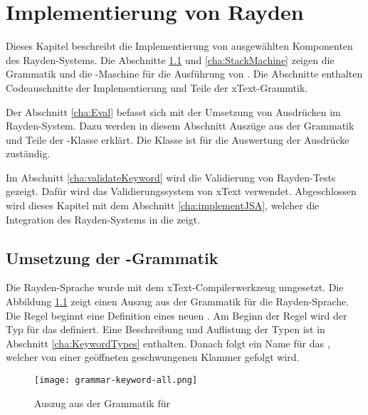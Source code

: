 \chapter{Implementierung von Rayden}
\label{cha:Implementierung}

Dieses Kapitel beschreibt die Implementierung von ausgewählten Komponenten des Rayden-Systems. Die Abschnitte \ref{cha:KeywordGrammar} und \ref{cha:StackMachine} zeigen die Grammatik und die -Maschine für die Ausführung von . Die Abschnitte enthalten Codeauschnitte der Implementierung und Teile der xText-Grammtik.

\SuperPar
Der Abschnitt \ref{cha:Eval} befasst sich mit der Umsetzung von Ausdrücken im Rayden-System. Dazu werden in diesem Abschnitt Auszüge aus der Grammatik und Teile der -Klasse erklärt. Die Klasse  ist für die Auswertung der Ausdrücke zuständig. 

\SuperPar
Im Abschnitt \ref{cha:validateKeyword} wird die Validierung von Rayden-Tests gezeigt. Dafür wird das Validierungssystem von xText verwendet. Abgeschlossen wird dieses Kapitel mit dem Abschnitt \ref{cha:implementJSA}, welcher die Integration des Rayden-Systems in die  zeigt. 


\section{Umsetzung der -Grammatik}
\label{cha:KeywordGrammar}

Die Rayden-Sprache wurde mit dem xText-Compilerwerkzeug umgesetzt. Die Abbildung \ref{fig:keywordGrammar} zeigt einen Auszug aus der Grammatik für die Rayden-Sprache. Die Regel  beginnt eine Definition eines neuen . Am Beginn der Regel wird der Typ für das  definiert. Eine Beschreibung und Auflistung der Typen ist in Abschnitt \ref{cha:KeywordTypes} enthalten. Danach folgt ein Name für das , welcher von einer geöffneten geschwungenen Klammer gefolgt wird.

\begin{figure}
\centering
\texttt{[image: grammar-keyword-all.png]}
\caption{Auszug aus der Grammatik für }
\label{fig:keywordGrammar}
\end{figure}

